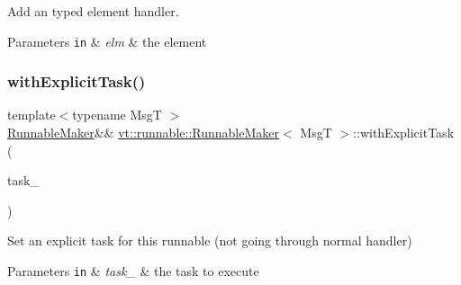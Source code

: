 Add an typed element handler. 


\begin{DoxyParams}[1]{Parameters}
\mbox{\tt in}  & {\em elm} & the element \\
\hline
\end{DoxyParams}
\mbox{\label{structvt_1_1runnable_1_1_runnable_maker_abe4aca5620c53dc9e035c3a60fe8c76b}} 
\subsubsection{\texorpdfstring{with\+Explicit\+Task()}{withExplicitTask()}}
{\footnotesize\ttfamily template$<$typename MsgT $>$ \\
\hyperlink{structvt_1_1runnable_1_1_runnable_maker}{Runnable\+Maker}\&\& \hyperlink{structvt_1_1runnable_1_1_runnable_maker}{vt\+::runnable\+::\+Runnable\+Maker}$<$ MsgT $>$\+::with\+Explicit\+Task (\begin{DoxyParamCaption}\item[{\hyperlink{namespacevt_ae0a5a7b18cc99d7b732cb4d44f46b0f3}{Action\+Type}}]{task\+\_\+ }\end{DoxyParamCaption})\hspace{0.3cm}{\ttfamily [inline]}}



Set an explicit task for this runnable (not going through normal handler) 


\begin{DoxyParams}[1]{Parameters}
\mbox{\tt in}  & {\em task\+\_\+} & the task to execute \\
\hline
\end{DoxyParams}
\mbox{\label{structvt_1_1runnable_1_1_runnable_maker_a92f6e8577ac1a9828a09bc64fe665b32}} 
